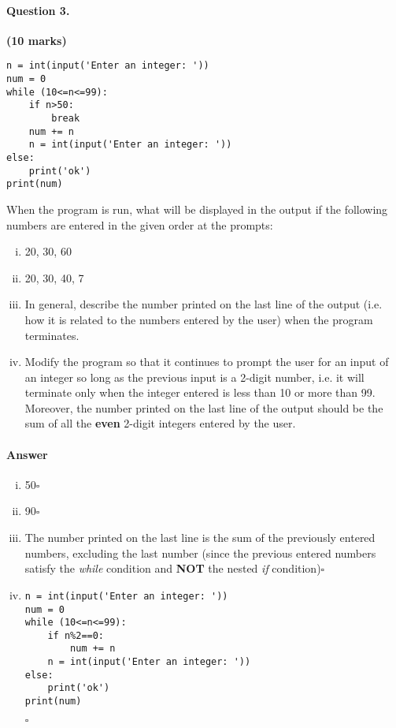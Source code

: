 \documentclass[12pt]{article}
\newcommand{\EOQ}{\hfill $\square$}
\begin{document}
\paragraph{Question 3.}\hfill {\bf (10 marks)}
\\\begin{verbatim}
n = int(input('Enter an integer: '))
num = 0
while (10<=n<=99):
    if n>50:
        break
    num += n
    n = int(input('Enter an integer: '))
else:
    print('ok')
print(num)
\end{verbatim}
When the program is run, what will be displayed in the output if the following numbers are entered in the given order at the prompts:
\begin{enumerate}[(i)]
\item 20, 30, 60
\item 20, 30, 40, 7
\item In general, describe the number printed on the last line of the output (i.e. how it is related to the numbers entered by the user) when the program terminates.
\item Modify the program so that it continues to prompt the user for an input of an integer so long as the previous input is a 2-digit number, i.e. it will terminate only when the integer entered is less than 10 or more than 99. Moreover, the number printed on the last line of the output should be the sum of all the \textbf{even} 2-digit integers entered by the user.
\end{enumerate}
\paragraph{Answer}
\begin{enumerate}[(i)]
\item 50\EOQ
\item 90\EOQ
\item The number printed on the last line is the sum of the previously entered numbers, excluding the last number (since the previous entered numbers satisfy the \textit{while} condition and \textbf{NOT} the nested \textit{if} condition)\EOQ
\item \begin{verbatim}
n = int(input('Enter an integer: '))
num = 0
while (10<=n<=99):
    if n%2==0:
        num += n
    n = int(input('Enter an integer: '))
else:
    print('ok')
print(num)
\end{verbatim}
\EOQ
\end{enumerate}
\clearpage
\end{document}
